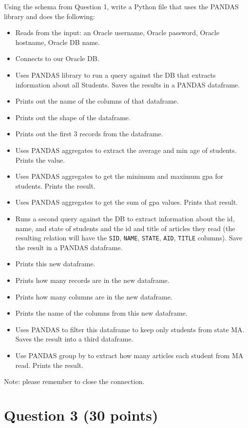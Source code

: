\documentclass[letterpaper, 11pt]{article}
\begin{document}
Using the schema from Question 1, write a Python file that uses the PANDAS library and does the following:
\begin{itemize}[label=-,leftmargin=*]
    \item Reads from the input: an Oracle username, Oracle password, Oracle hostname, Oracle DB name.
    \item Connects to our Oracle DB.
    \item Uses PANDAS library to run a query against the DB that extracts information about all Students. Saves the results in a PANDAS dataframe.
    \item Prints out the name of the columns of that dataframe.
    \item Prints out the shape of the dataframe.
    \item Prints out the first 3 records from the dataframe.
    \item Uses PANDAS aggregates to extract the average and min age of students. Prints the value.
    \item Uses PANDAS aggregates to get the minimum and maximum gpa for students. Prints the result.
    \item Uses PANDAS aggregates to get the sum of gpa values. Prints that result.
    \item Runs a second query against the DB to extract information about the id, name, and state of students and the id and title of articles they read (the resulting relation will have the \texttt{SID}, \texttt{NAME}, \texttt{STATE}, \texttt{AID}, \texttt{TITLE} columns). Save the result in a PANDAS dataframe.
    \item Prints this new dataframe.
    \item Prints how many records are in the new dataframe.
    \item Prints how many columns are in the new dataframe.
    \item Prints the name of the columns from this new dataframe.
    \item Uses PANDAS to filter this dataframe to keep only students from state MA. Saves the result into a third dataframe.
    \item Use PANDAS group by to extract how many articles each student from MA read. Prints the result.
\end{itemize}

Note: please remember to close the connection.

\section*{Question 3 (30 points)}
\end{document}
